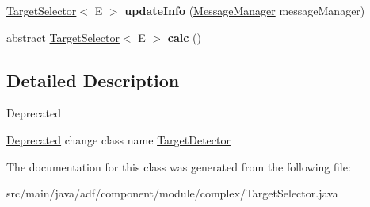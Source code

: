 \begin{DoxyCompactItemize}
\hypertarget{classadf_1_1component_1_1module_1_1complex_1_1TargetSelector_a91278e0b3b662efd8617e96309248942}{}\label{classadf_1_1component_1_1module_1_1complex_1_1TargetSelector_a91278e0b3b662efd8617e96309248942} 
\hyperlink{classadf_1_1component_1_1module_1_1complex_1_1TargetSelector}{Target\+Selector}$<$ E $>$ {\bfseries update\+Info} (\hyperlink{classadf_1_1agent_1_1communication_1_1MessageManager}{Message\+Manager} message\+Manager)
\item 
\hypertarget{classadf_1_1component_1_1module_1_1complex_1_1TargetSelector_a1e776672858945c16604c7e7e2e8eafe}{}\label{classadf_1_1component_1_1module_1_1complex_1_1TargetSelector_a1e776672858945c16604c7e7e2e8eafe} 
abstract \hyperlink{classadf_1_1component_1_1module_1_1complex_1_1TargetSelector}{Target\+Selector}$<$ E $>$ {\bfseries calc} ()
\end{DoxyCompactItemize}


\subsection{Detailed Description}
\begin{DoxyRefDesc}{Deprecated}
\item[\hyperlink{deprecated__deprecated000016}{Deprecated}]change class name \hyperlink{classadf_1_1component_1_1module_1_1complex_1_1TargetDetector}{Target\+Detector} \end{DoxyRefDesc}


The documentation for this class was generated from the following file\+:\begin{DoxyCompactItemize}
\item 
src/main/java/adf/component/module/complex/Target\+Selector.\+java\end{DoxyCompactItemize}
